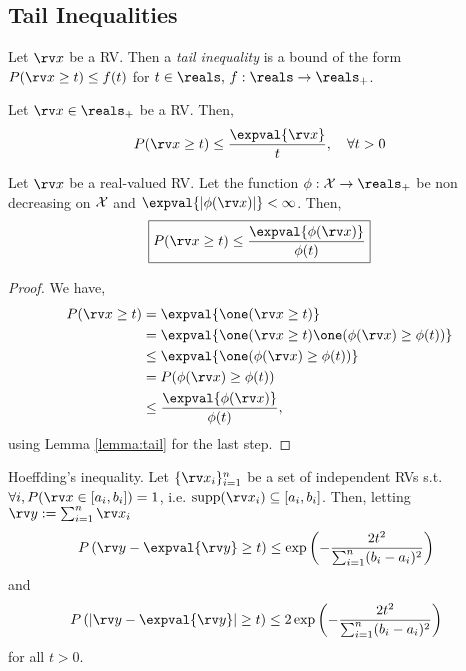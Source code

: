 \documentclass[11pt]{article}
\newcommand{\showproofs}{1} %
\begin{document}
\subsection{Tail Inequalities}

\begin{defn}
  Let $\rv x$ be a RV. Then a \emph{tail inequality} is a bound of the form $P(\rv x \geq t) \leq f(t)$ for $t\in\reals,\, f:\reals\rightarrow\reals_+$.
\end{defn}

\begin{lemma}\label{lemma:tail}
  Let $\rv x \in \reals_+$ be a RV. Then,
  \begin{equation}
    P(\rv x \geq t) \leq \frac{\expval{\rv x}}{t}, \hspace{1em} \forall t>0
  \end{equation}
\end{lemma}

\begin{lemma}\label{lemma:tail_phi}
  Let $\rv x$ be a real-valued RV. Let the function $\phi:\xalph\rightarrow\reals_+$ be non decreasing on $\mathcal{X}$ and $\expval{|\phi(\rv x)|}<\infty$. Then,
  \begin{equation}
    \boxed{
      P(\rv x \geq t) \leq \frac{\expval{\phi(\rv x)}}{\phi(t)}
    }
  \end{equation}
\end{lemma}
\begin{proof}
  We have,
  \begin{equation*}\begin{aligned}
    P(\rv x \geq t) &= \expval{\one(\rv x \geq t)} \\
      &= \expval{\one(\rv x \geq t)\one(\phi(\rv x) \geq \phi(t))}\\
      &\leq \expval{\one(\phi(\rv x) \geq \phi(t))}\\
      &= P(\phi(\rv x) \geq \phi(t))\\
      &\leq \frac{\expval{\phi(\rv x)}}{\phi(t)},
  \end{aligned}\end{equation*}
  using Lemma \ref{lemma:tail} for the last step.
\end{proof}

\begin{thm} Hoeffding's inequality.
  Let $\{\rv x_i\}_{i=1}^n$ be a set of independent RVs s.t. \\$\forall i, P(\rv x \in [a_i,b_i]) = 1$, i.e. $\mathrm{supp}(\rv x_i) \subseteq [a_i, b_i]$. Then, letting $\rv y := \sum_{i=1}^{n} \rv x_i$
  \begin{equation}
    P\left(\rv y - \expval{\rv y} \geq t \right) \leq \exp\left(-\frac{2t^2}{\sum_{i=1}^{n}(b_i - a_i)^2}\right)\,\,\, 
  \end{equation}
  and
  \begin{equation}
    P\left(\left|\rv y - \expval{\rv y}\right| \geq t \right) \leq 2\exp\left(-\frac{2t^2}{\sum_{i=1}^{n}(b_i - a_i)^2}\right)\,\,\, 
  \end{equation}
  for all $t>0$.
\end{thm}
\end{document}
